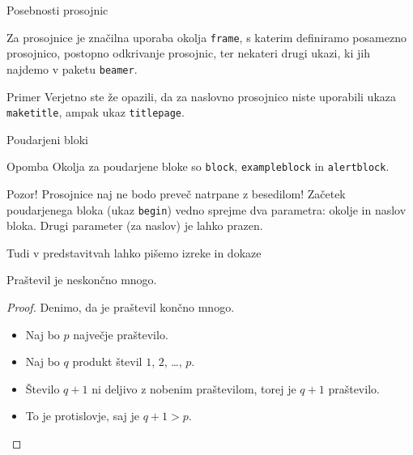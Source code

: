 \begin{frame}{Posebnosti prosojnic}

	Za prosojnice je značilna uporaba okolja \texttt{frame},
	s katerim definiramo posamezno prosojnico,
	\pause
	postopno odkrivanje prosojnic,
	\pause
	ter nekateri drugi ukazi, ki jih najdemo v paketu \texttt{beamer}.
	\pause
	\begin{exampleblock}{Primer}
		Verjetno ste že opazili, da za naslovno prosojnico niste uporabili
		ukaza \texttt{maketitle}, ampak ukaz \texttt{titlepage}.
	\end{exampleblock}
\end{frame}

\begin{frame}{Poudarjeni bloki}

		\begin{exampleblock}{Opomba}
			Okolja za poudarjene bloke so \texttt{block}, \texttt{exampleblock} in \texttt{alertblock}.
		\end{exampleblock}

		\begin{alertblock}{	Pozor!}
			Prosojnice naj ne bodo preveč natrpane z besedilom!
		Začetek poudarjenega bloka (ukaz \texttt{begin}) vedno sprejme 
		dva parametra: okolje in naslov bloka.
		Drugi parameter (za naslov) je lahko prazen. 
		\end{alertblock}

\end{frame}

\begin{frame}{Tudi v predstavitvah lahko pišemo izreke in dokaze}

	\begin{izrek}
	   Praštevil je neskončno mnogo.
	\end{izrek}
	\begin{proof}
	   Denimo, da je praštevil končno mnogo.
	   \begin{itemize}[<+->]
		  \item Naj bo $p$ \alert<4>{največje} praštevilo. 
		  \item Naj bo $q$ produkt števil $1$, $2$, \ldots, $p$.
		  \item Število $q+1$ ni deljivo z nobenim praštevilom, torej je $q+1$ praštevilo.
		  \item To je protislovje, saj je $q+1>p$. \qedhere
	   \end{itemize}
	\end{proof}
 \end{frame}
 
